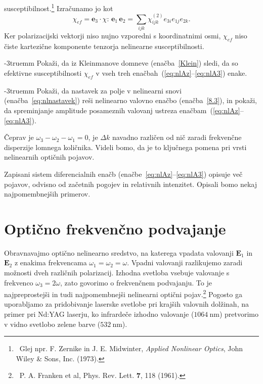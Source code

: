 susceptibilnost.\footnote{~Glej npr. F. Zernike in J. E. Midwinter, 
{\it Applied Nonlinear Optics}, John Wiley \& Sons, Inc. (1973).}
Izračunamo jo kot 
\begin{equation}
\chi_{ef}=\mathbf{e}_{3}\cdot\chi:\,\mathbf{e}_{1}\,\mathbf{e}_{2} = 
\sum_{ijk} \chi_{ijk}^{(2)} e_{3i} e_{1j} e_{2k}.
\label{eq:chicomp}
\end{equation}
Ker polarizacijski vektorji niso nujno vzporedni s koordinatnimi osmi, $\chi_{ef}$ 
niso čiste kartezične komponente tenzorja nelinearne susceptibilnosti.
\begin{definition}
\vglue-3truemm
Pokaži, da iz Kleinmanove domneve (enačba~\ref{Klein}) sledi, da so 
efektivne susceptibilnosti $\chi_{ef}$ v vseh treh enačbah~(\ref{eq:nlAz}--\ref{eq:nlA3}) enake.
\end{definition}
\begin{definition}
\vglue-3truemm
Pokaži, da nastavek za polje v nelinearni snovi (enačba~\ref{eq:nlnastavek}) reši nelinearno
valovno enačbo (enačba~\ref{8.3}), in pokaži, da spreminjanje amplitude posameznih valovanj 
ustreza enačbam~(\ref{eq:nlAz}--\ref{eq:nlA3}).
\end{definition}
Čeprav je $\omega_{3}-\omega_{2}-\omega_{1}=0$, je $\Delta k$ navadno različen od nič zaradi 
frekvenčne disperzije lomnega količnika. Videli bomo, da je to ključnega pomena 
pri vrsti nelinearnih optičnih pojavov. 

Zapisani sistem diferencialnih enačb (enačbe~\ref{eq:nlAz}--\ref{eq:nlA3}) opisuje več pojavov, 
odvisno od začetnih pogojev in relativnih intenzitet. Opisali bomo nekaj
najpomembnejših primerov.

\section{Optično frekvenčno podvajanje}
\label{chap:SHG}
Obravnavajmo optično nelinearno sredstvo, na katerega vpadata valovanji ${\mathbf E}_1$ in
$\mathbf{E}_2$ z enakima frekvencama $\omega_{1}=\omega_{2}=\omega$. Vpadni valovanji
razlikujemo zaradi možnosti dveh različnih polarizacij. Izhodna svetloba vsebuje valovanje
s frekvenco $\omega_{3}=2\omega$, zato govorimo o frekvenčnem 
podvajanju. To je
najpreprostejši in tudi najpomembnejši nelinearni optični pojav.\footnote{~P. A. Franken et al, Phys. Rev. Lett.
$\mathbf{7}$, 118 (1961).} 
Pogosto ga uporabljamo za pridobivanje laserske svetlobe pri krajših valovnih dolžinah, na primer
pri Nd:YAG laserju, ko infrardeče izhodno valovanje ($1064~\si{\nano\metre}$) 
pretvorimo v vidno svetlobo zelene barve ($532~\si{\nano\metre}$). 

